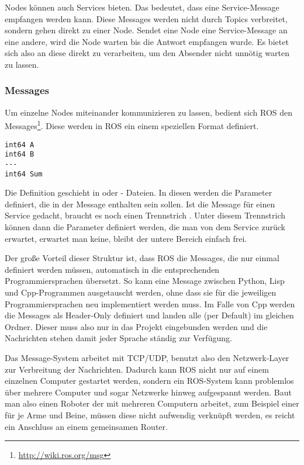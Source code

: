 Nodes können auch Services bieten. Das bedeutet, dass eine Service-Message empfangen werden kann. Diese Messages werden nicht durch Topics verbreitet, sondern gehen direkt zu einer Node. Sendet eine Node eine Service-Message an eine andere, wird die Node warten bis die Antwort empfangen wurde. Es bietet sich also an diese direkt zu verarbeiten, um den Absender nicht unnötig warten zu lassen.

\subsubsection*{Messages}
Um einzelne Nodes miteinander kommunizieren zu lassen, bedient sich ROS den Messages\footnote{\url{http://wiki.ros.org/msg}}. Diese werden in ROS ein einem speziellen Format definiert.

\begin{lstlisting}[style=ros, title=Message für einen Service der 2 Zahlen addiert und das Ergebnis zurück gibt]
int64 A
int64 B
---
int64 Sum
\end{lstlisting}

Die Definition geschieht in  oder  - Dateien. In diesen werden die Parameter definiert, die in der Message enthalten sein sollen. Ist die Message für einen Service gedacht, braucht es noch einen Trennstrich \highlight{---}. Unter diesem Trennstrich können dann die Parameter definiert werden, die man von dem Service zurück erwartet, erwartet man keine, bleibt der untere Bereich einfach frei.

Der große Vorteil dieser Struktur ist, dass ROS die Messages, die nur einmal definiert werden müssen, automatisch in die entsprechenden Programmiersprachen übersetzt. So kann eine Message zwischen Python, Lisp und Cpp-Programmen ausgetauscht werden, ohne dass sie für die jeweiligen Programmiersprachen neu implementiert werden muss. Im Falle von Cpp werden die Messages als Header-Only definiert und landen alle (per Default) im gleichen Ordner. Dieser muss also nur in das Projekt eingebunden werden und die Nachrichten stehen damit jeder Sprache ständig zur Verfügung.

Das Message-System arbeitet mit TCP/UDP, benutzt also den Netzwerk-Layer zur Verbreitung der Nachrichten. Dadurch kann ROS nicht nur auf einem einzelnen Computer gestartet werden, sondern ein ROS-System kann problemlos über mehrere Computer und sogar Netzwerke hinweg aufgespannt werden. Baut man also einen Roboter der mit mehreren Computern arbeitet, zum Beispiel einer für je Arme und Beine, müssen diese nicht aufwendig verknüpft werden, es reicht ein Anschluss an einem gemeinsamen Router.

